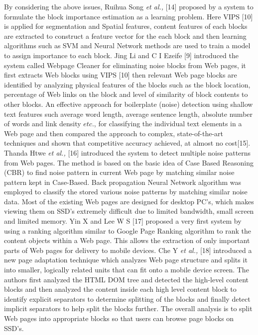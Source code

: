 \documentclass[fleqn,twoside]{article}
\begin{document}
\vskip 2mm
By considering the above issues, Ruihua Song {\it et al.,} [14] proposed by a system to formulate the block importance estimation as a learning problem. Here VIPS [10] is applied for segmentation and Spatial features, content features of each blocks are extracted to construct a feature vector for the each block and then learning algorithms such as SVM and Neural Network methods are used to train a model to assign importance to each block. Jing Li and C I Ezeife [9] introduced the system called Webpage Cleaner for eliminating noise blocks from Web pages, it first extracts Web blocks using VIPS [10] then relevant Web page blocks are identified by analyzing physical features of the blocks such as the block location, percentage of Web links on the block and level of similarity of block contents to other blocks. An effective approach for boilerplate (noise) detection using shallow text features such average word length, average sentence length, absolute number of words and link density $etc.$, for classifying the individual text elements in a Web page and then compared the approach to complex, state-of-the-art techniques and shown that competitive accuracy achieved, at almost no cost[15]. Thanda Htwe {\it et al.,} [16] introduced the system to detect multiple noise patterns from Web pages. The method is based on the basic idea of Case Based Reasoning (CBR) to find noise pattern in current Web page by matching similar noise pattern kept in Case-Based. Back propagation Neural Network algorithm was employed to classify the stored various noise patterns by matching similar noise data. 
\vskip 2mm
Most of the existing Web pages are designed for desktop PC's, which makes viewing them on SSD's extremely difficult due to limited bandwidth, small screen and limited memory. Yin X and Lee W S [17] proposed a very first system by using a ranking algorithm similar to Google Page Ranking algorithm to rank the content objects within a Web page. This allows the extraction of only important parts of Web pages for delivery to mobile devices. Che Y {\it et al.,} [18] introduced a new page adaptation technique which analyzes Web page structure and splits it into smaller, logically related units that can fit onto a mobile device screen. The authors first analyzed the HTML DOM tree and detected the high-level content blocks and then analyzed the content inside each high level content block to identify explicit separators to determine splitting of the blocks and finally detect implicit separators to help split the blocks further. The overall analysis is to split Web pages into appropriate blocks so that users can browse page blocks on SSD's.
\end{document}
